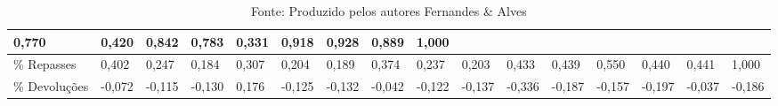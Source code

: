 \begin{spacing}{1}
\begin{landscape}
\begin{table}[H]
\begin{tabular}{|p{2.8cm}|lllllllllllllll|}
          \cellcolor[HTML]{3BC379}0,770 &
          \cellcolor[HTML]{94DEB6}0,420 &
          \cellcolor[HTML]{29BD6C}0,842 &
          \cellcolor[HTML]{38C276}0,783 &
          \cellcolor[HTML]{ABE5C6}0,331 &
          \cellcolor[HTML]{15B75F}0,918 &
          \cellcolor[HTML]{13B65D}0,928 &
          \cellcolor[HTML]{1DB964}0,889 &
          \cellcolor[HTML]{00B050}1,000 &
           \\ \hline
        \% Repasses &
          \cellcolor[HTML]{99E0B9}0,402 &
          \cellcolor[HTML]{C1ECD4}0,247 &
          \cellcolor[HTML]{D1F1DF}0,184 &
          \cellcolor[HTML]{B1E7CA}0,307 &
          \cellcolor[HTML]{CBEFDC}0,204 &
          \cellcolor[HTML]{CFF1DE}0,189 &
          \cellcolor[HTML]{A0E2BE}0,374 &
          \cellcolor[HTML]{C3EDD6}0,237 &
          \cellcolor[HTML]{CCEFDC}0,203 &
          \cellcolor[HTML]{91DDB4}0,433 &
          \cellcolor[HTML]{90DDB3}0,439 &
          \cellcolor[HTML]{73D49F}0,550 &
          \cellcolor[HTML]{8FDDB3}0,440 &
          \cellcolor[HTML]{8FDDB2}0,441 &
          \cellcolor[HTML]{00B050}1,000 
           \\ \hline
        \% Devoluções &
          \cellcolor[HTML]{ECF9F2}-0,072 &
          \cellcolor[HTML]{E1F5EA}-0,115 &
          \cellcolor[HTML]{DDF4E8}-0,130 &
          \cellcolor[HTML]{D3F2E1} 0,176 &
          \cellcolor[HTML]{DFF5E9}-0,125 &
          \cellcolor[HTML]{DDF4E7}-0,132 &
          \cellcolor[HTML]{F4FBF7}-0,042 &
          \cellcolor[HTML]{DFF5E9}-0,122 &
          \cellcolor[HTML]{DCF4E7}-0,137 &
          \cellcolor[HTML]{A9E4C4}-0,336 &
          \cellcolor[HTML]{CFF0DE}-0,187 &
          \cellcolor[HTML]{D6F2E3}-0,157 &
          \cellcolor[HTML]{CCEFDC}-0,197 &
          \cellcolor[HTML]{F5FCF8}-0,037 &
          \cellcolor[HTML]{CFF0DE}-0,186 \\ \hline
    \end{tabular}
    \caption*{Fonte: Produzido pelos autores Fernandes \& Alves}
\end{table}
\end{landscape}
\end{spacing}

